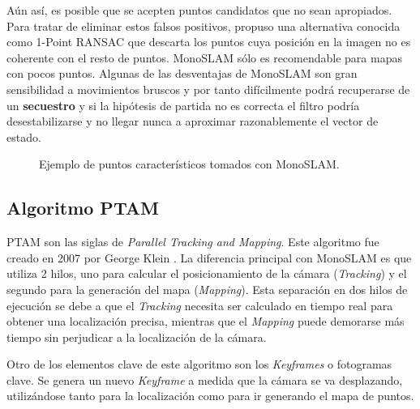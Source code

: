 Aún así, es posible que se acepten puntos candidatos que no sean apropiados. Para tratar de eliminar estos falsos positivos, \cite{civera20101} propuso una alternativa conocida como 1-Point RANSAC que descarta los puntos cuya posición en la imagen no es coherente con el resto de puntos.
MonoSLAM sólo es recomendable para mapas con pocos puntos. Algunas de las desventajas de MonoSLAM son 
 gran sensibilidad a movimientos bruscos y por tanto difícilmente podrá recuperarse de un \textbf{secuestro} y si la hipótesis de partida no es correcta el filtro podría desestabilizarse y no llegar nunca a aproximar razonablemente el vector de estado.


\begin{figure}[H]
\begin{center}
\end{center}
\caption{Ejemplo de puntos característicos tomados con MonoSLAM.}
\end{figure}
\clearpage


\subsection{Algoritmo PTAM}
PTAM son las siglas de \textit{Parallel Tracking and \textit{Mapping}}. Este algoritmo fue creado en 2007 por George Klein \cite{Klein2007parallel}. La diferencia principal con MonoSLAM es que utiliza 2 hilos, uno para calcular el posicionamiento de la cámara (\textit{Tracking}) y el segundo para la generación del mapa (\textit{Mapping}). Esta separación en dos hilos de ejecución se debe a que el \textit{Tracking} necesita ser calculado en tiempo real para obtener una localización precisa, mientras que el \textit{Mapping} puede demorarse más tiempo sin perjudicar a la localización de la cámara. 

Otro de los elementos clave de este algoritmo son los \textit{Keyframes} o fotogramas clave. Se genera un nuevo \textit{Keyframe} a medida que la cámara se va desplazando, utilizándose tanto para la localización como para ir generando el mapa de puntos.

